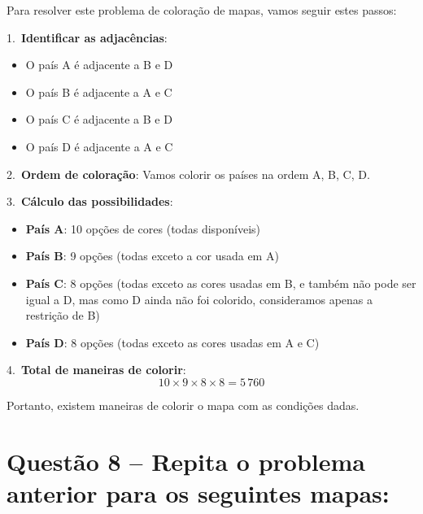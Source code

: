 \documentclass[12pt,a4paper]{article}
\begin{document}
    \vspace{0.5cm}

    \begin{center}
    \end{center}

    Para resolver este problema de coloração de mapas, vamos seguir estes passos:

    1.~\textbf{Identificar as adjacências}:
    \begin{itemize}
    \item O país A é adjacente a B e D
    \item O país B é adjacente a A e C
    \item O país C é adjacente a B e D
    \item O país D é adjacente a A e C
    \end{itemize}

    2.~\textbf{Ordem de coloração}: Vamos colorir os países na ordem A, B, C, D.

    3.~\textbf{Cálculo das possibilidades}:
    \begin{itemize}
        \item \textbf{País A}: 10 opções de cores (todas disponíveis)
        \item \textbf{País B}: 9 opções (todas exceto a cor usada em A)
        \item \textbf{País C}: 8 opções (todas exceto as cores usadas em B, e também não pode ser igual a D, mas como D ainda não foi colorido, consideramos apenas a restrição de B)
        \item \textbf{País D}: 8 opções (todas exceto as cores usadas em A e C)
    \end{itemize}

    4.~\textbf{Total de maneiras de colorir}:
    \[
    10 \times 9 \times 8 \times 8 = 5\,760
    \]

    Portanto, existem  maneiras de colorir o mapa com as condições dadas.

\section*{Questão 8 -- Repita o problema anterior para os seguintes mapas:}
\end{document}
